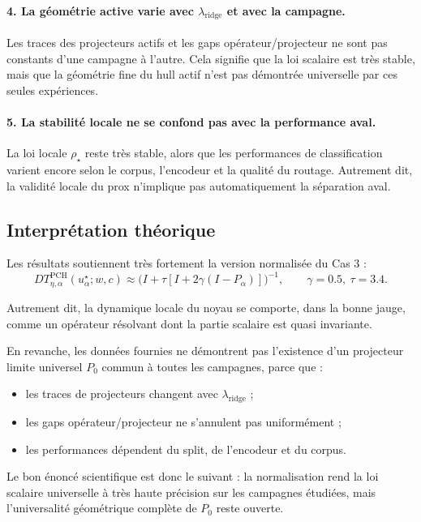 \paragraph{4. La géométrie active varie avec \(\lambda_{\mathrm{ridge}}\) et avec la campagne.}
Les traces des projecteurs actifs et les gaps opérateur/projecteur ne sont pas constants d’une campagne à l’autre.  
Cela signifie que la loi scalaire est très stable, mais que la géométrie fine du hull actif n’est pas démontrée universelle par ces seules expériences.

\paragraph{5. La stabilité locale ne se confond pas avec la performance aval.}
La loi locale \(\rho_\star\) reste très stable, alors que les performances de classification varient encore selon le corpus, l’encodeur et la qualité du routage.  
Autrement dit, la validité locale du prox n’implique pas automatiquement la séparation aval.

\subsection{Interprétation théorique}

Les résultats soutiennent très fortement la version normalisée du Cas 3 :
\[
DT_{\eta,\alpha}^{\mathrm{PCH}}(u_\alpha^\star;w,c)
\approx
\bigl(I+\tau[I+2\gamma(I-P_\alpha)]\bigr)^{-1},
\qquad
\gamma=0.5,\ \tau=3.4.
\]

Autrement dit, la dynamique locale du noyau se comporte, dans la bonne jauge, comme un opérateur résolvant dont la partie scalaire est quasi invariante.

En revanche, les données fournies ne démontrent pas l’existence d’un projecteur limite universel \(P_0\) commun à toutes les campagnes, parce que :
\begin{itemize}
    \item les traces de projecteurs changent avec \(\lambda_{\mathrm{ridge}}\) ;
    \item les gaps opérateur/projecteur ne s’annulent pas uniformément ;
    \item les performances dépendent du split, de l’encodeur et du corpus.
\end{itemize}

Le bon énoncé scientifique est donc le suivant :
la normalisation rend la loi scalaire universelle à très haute précision sur les campagnes étudiées,
mais l’universalité géométrique complète de \(P_0\) reste ouverte.

